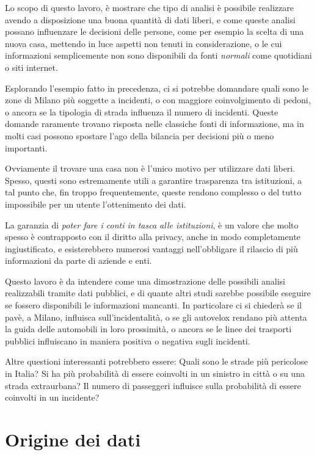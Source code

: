 \documentclass[a4paper]{report}
\begin{document}
Lo scopo di questo lavoro, è mostrare che tipo di analisi è possibile realizzare 
avendo a disposizione una buona quantità di dati liberi, e come queste analisi possano 
influenzare le decisioni delle persone, come per esempio la scelta di una nuova casa, 
mettendo in luce aspetti non tenuti in considerazione, o le cui informazioni semplicemente 
non sono disponibili da fonti \textit{normali} come quotidiani o siti internet.

Esplorando l'esempio fatto in precedenza, ci si potrebbe domandare quali sono le zone 
di Milano più soggette a incidenti, o con maggiore coinvolgimento di pedoni, 
o ancora se la tipologia di strada influenza il numero di incidenti. 
Queste domande raramente trovano risposta nelle classiche fonti di informazione, 
ma in molti casi possono spostare l'ago della bilancia per decisioni più o meno 
importanti.

Ovviamente il trovare una casa non è l'unico motivo per utilizzare dati liberi. 
Spesso, questi sono estremamente utili a garantire trasparenza tra istituzioni, 
a tal punto che, fin troppo frequentemente, queste rendono complesso o del tutto impossibile 
per un utente l'ottenimento dei dati.

La garanzia di \textit{poter fare i conti in tasca alle istituzioni}, è un valore che molto 
spesso è contrapposto con il diritto alla privacy, anche in modo completamente ingiustificato, 
e esisterebbero numerosi vantaggi nell'obbligare il rilascio di più informazioni da parte di 
aziende e enti.

Questo lavoro è da intendere come una dimostrazione delle possibili analisi realizzabili 
tramite dati pubblici, e di quante altri studi sarebbe possibile eseguire se fossero 
disponibili le informazioni mancanti.
In particolare ci si chiederà se il pavè, a Milano, influisca sull'incidentalità, 
o se gli autovelox rendano più attenta la guida delle automobili in loro prossimità, o 
ancora se le linee dei trasporti pubblici influiscano in maniera positiva o negativa sugli 
incidenti.

Altre questioni interessanti potrebbero essere: 
Quali sono le strade più pericolose in Italia? 
Si ha più probabilità di essere coinvolti in un sinistro in città o su una strada extraurbana? 
Il numero di passeggeri influisce sulla probabilità di essere coinvolti in un incidente?

\chapter{Origine dei dati}
\end{document}
